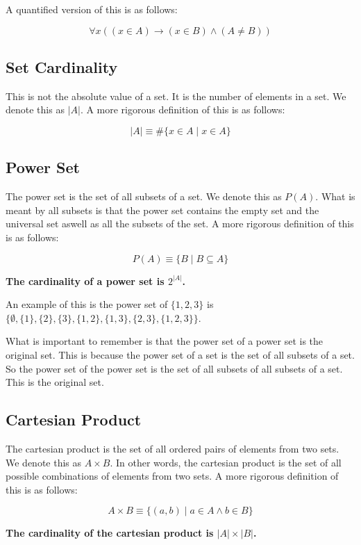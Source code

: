 \documentclass[11pt]{article}
\begin{document}
A quantified version of this is as follows:

\[
\forall x ((x \in A) \to (x \in B) \land (A \neq B))
\]

\subsection{Set Cardinality}
\label{sec:org282547f}
This is not the absolute value of a set. It is the number of elements in a set. We denote this as \(|A|\). A more rigorous definition of this is as follows:

\[
\vert A \vert \equiv \# \{x \in A \mid x \in A\}
\]

\subsection{Power Set}
\label{sec:orgf761791}
The power set is the set of all subsets of a set. We denote this as \(P(A)\). What is meant by all subsets is that the power set contains the empty set and the universal set aswell as all the subsets of the set. A more rigorous definition of this is as follows:

\[
P(A) \equiv \{B \mid B \subseteq A\}
\]

\textbf{The cardinality of a power set is \(2^{|A|}\).}

An example of this is the power set of \(\{1,2,3\}\) is \(\{\emptyset, \{1\}, \{2\}, \{3\}, \{1,2\}, \{1,3\}, \{2,3\}, \{1,2,3\}\}\).

What is important to remember is that the power set of a power set is the original set. This is because the power set of a set is the set of all subsets of a set. So the power set of the power set is the set of all subsets of all subsets of a set. This is the original set.

\subsection{Cartesian Product}
\label{sec:org94bbbf8}
The cartesian product is the set of all ordered pairs of elements from two sets. We denote this as \(A \times B\). In other words, the cartesian product is the set of all possible combinations of elements from two sets. A more rigorous definition of this is as follows:

\[
A \times B \equiv \{(a,b) \mid a \in A \land b \in B\}
\]

\textbf{The cardinality of the cartesian product is \(|A| \times |B|\).}
\end{document}
